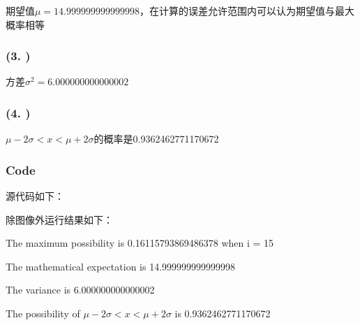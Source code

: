 \documentclass{article}
\begin{document}
期望值$\mu=14.999999999999998$，在计算的误差允许范围内可以认为期望值与最大概率相等

\subsubsection*{(3. )}

方差$\sigma^2=6.000000000000002$

\subsubsection*{(4. )}

$\mu-2\sigma<x<\mu+2\sigma$的概率是0.9362462771170672

\subsubsection*{Code}

源代码如下：



除图像外运行结果如下：

The maximum possibility is 0.16115793869486378 when i = 15

The mathematical expectation is 14.999999999999998

The variance is 6.000000000000002

The possibility of $\mu-2\sigma<x<\mu+2\sigma$ is 0.9362462771170672
\end{document}
